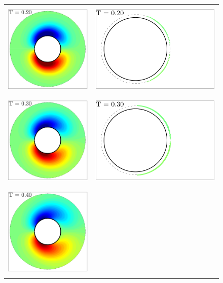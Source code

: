 \begin{figure}
 \begin{center}
 \begin{tabular}{cc}
 \includegraphics[height=4.5cm]{./Figures/results/static/vorticity_T0_20.pdf} &
 \includegraphics[height=4.5cm]{./Figures/results/static/vortices_T0_20.pdf}  \\
 \includegraphics[height=4.5cm]{./Figures/results/static/vorticity_T0_30.pdf} &
 \includegraphics[height=4.5cm]{./Figures/results/static/vortices_T0_30.pdf}  \\
 \includegraphics[height=4.5cm]{./Figures/results/static/vorticity_T0_40.pdf} &

\end{tabular}
\end{center}
\end{figure}
